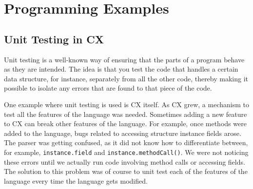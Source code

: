 \documentclass[11pt,fleqn,openany]{book} %
\begin{document}

\part{Programming Examples}


\chapter{Unit Testing in CX}
\label{chapter:unit-testing-in-cx}


Unit testing is a well-known way of ensuring that the parts of a program behave as they are intended. The idea is that you test the code that handles a certain data structure, for instance, separately from all the other code, thereby making it possible to isolate any errors that are found to that piece of the code.

One example where unit testing is used is CX itself. As CX grew, a mechanism to test all the features of the language was needed. Sometimes adding a new feature to CX can break other features of the language. For example, once methods were added to the language, bugs related to accessing structure instance fields arose. The parser was getting confused, as it did not know how to differentiate between, for example, \lstinline{instance.field} and \lstinline{instance.methodCall()}. We were not noticing these errors until we actually run code involving method calls or accessing fields. The solution to this problem was of course to unit test each of the features of the language every time the language gets modified.
\end{document}
